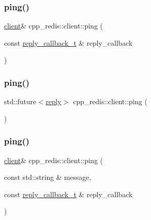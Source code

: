 \subsubsection{\texorpdfstring{ping()}{ping()}\hspace{0.1cm}{\footnotesize\ttfamily [1/4]}}
{\footnotesize\ttfamily \hyperlink{classcpp__redis_1_1client}{client}\& cpp\+\_\+redis\+::client\+::ping (\begin{DoxyParamCaption}\item[{const \hyperlink{classcpp__redis_1_1client_a061a1140d36d2eaeda82b09a0bb3f9f2}{reply\+\_\+callback\+\_\+t} \&}]{reply\+\_\+callback }\end{DoxyParamCaption})}

\mbox{\label{classcpp__redis_1_1client_a5273cf454284e04f4c43e1b391170009}} 
\subsubsection{\texorpdfstring{ping()}{ping()}\hspace{0.1cm}{\footnotesize\ttfamily [2/4]}}
{\footnotesize\ttfamily std\+::future$<$\hyperlink{classcpp__redis_1_1reply}{reply}$>$ cpp\+\_\+redis\+::client\+::ping (\begin{DoxyParamCaption}{ }\end{DoxyParamCaption})}

\mbox{\label{classcpp__redis_1_1client_a399c32f46d82d844b661647f64d9fb97}} 
\subsubsection{\texorpdfstring{ping()}{ping()}\hspace{0.1cm}{\footnotesize\ttfamily [3/4]}}
{\footnotesize\ttfamily \hyperlink{classcpp__redis_1_1client}{client}\& cpp\+\_\+redis\+::client\+::ping (\begin{DoxyParamCaption}\item[{const std\+::string \&}]{message,  }\item[{const \hyperlink{classcpp__redis_1_1client_a061a1140d36d2eaeda82b09a0bb3f9f2}{reply\+\_\+callback\+\_\+t} \&}]{reply\+\_\+callback }\end{DoxyParamCaption})}

